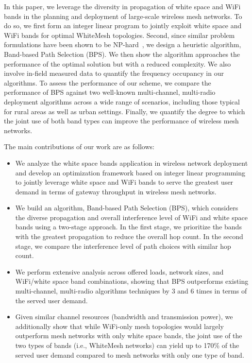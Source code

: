 In this paper, we leverage the diversity in propagation of
white space and WiFi bands in the planning and deployment
of large-scale wireless mesh networks. To do so, we first form an
integer linear program to jointly exploit 
white space and WiFi bands for optimal WhiteMesh topologies.
Second, since similar problem formulations have been shown to be 
NP-hard~\cite{jain2005impact,doraghinejad2014channel}, we design a heuristic algorithm, 
Band-based Path Selection (BPS). We then
show the algorithm approaches the performance of the 
optimal solution but with a reduced complexity. 
We also involve in-field measured data to quantify the 
frequency occupancy in our algorithms.
To assess the 
performance of our scheme, we compare the performance of 
BPS against two well-known multi-channel, multi-radio deployment 
algorithms across a wide range of scenarios, including those
typical for rural areas as well as urban settings. Finally, we
quantify the degree to which the joint use of both band types can improve the 
performance of wireless mesh networks.

The main contributions of our work are as follows:
\begin{itemize}
\item We analyze the white space bands application in wireless 
network deployment and develop an optimization framework based on integer
linear programming to jointly leverage white space and WiFi bands
to serve the greatest user demand in terms of gateway throughput 
in wireless mesh networks.  
\item We build an algorithm, Band-based Path 
Selection (BPS), which considers the diverse propagation 
and overall interference level of WiFi and white space bands using
a two-stage approach.  In the first stage, we prioritize the bands
with the greatest propagation to reduce the overall hop count. In the
second stage, we compare the interference level of path choices with
similar hop count. 
\item We perform extensive analysis across offered loads,
network sizes, and WiFi/white space band combinations, showing that BPS outperforms existing
multi-channel, multi-radio algorithms techniques by 3 and 6 times
in terms of the served user demand.  
\item Given similar channel resources
(bandwidth and transmission power), we additionally show that while
WiFi-only mesh topologies would largely outperform mesh networks with only
white space bands, the joint use of the two types of bands (i.e., WhiteMesh 
networks) can yield up to 170\% of the served user demand compared to mesh networks
with only one type of band.
\end{itemize}

